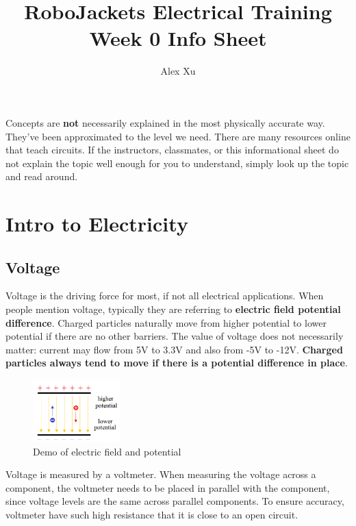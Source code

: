 \documentclass{article}
\title{RoboJackets Electrical Training Week 0 Info Sheet}
\author{Alex Xu}
\begin{document}
\maketitle{}
\setcounter{tocdepth}{2}
\tableofcontents
\vspace{120pt}
\large{Concepts are \textbf{not} necessarily explained in the most physically accurate way. They've been approximated to the level we need. There are many resources online that teach circuits. If the instructors, classmates, or this informational sheet do not explain the topic well enough for you to understand, simply look up the topic and read around.}

\pagebreak

\section{Intro to Electricity}
\subsection{Voltage}

Voltage is the driving force for most, if not all electrical applications. When people mention voltage, typically they are referring to \textbf{electric field potential difference}. Charged particles naturally move from higher potential to lower potential if there are no other barriers. The value of voltage does not necessarily matter: current may flow from 5V to 3.3V and also from -5V to -12V. \textbf{Charged particles always tend to move if there is a potential difference in place}.

\begin{figure}[!h]
	\center
	\includegraphics[width=0.3\textwidth, keepaspectratio]{efield}
	\caption{Demo of electric field and potential}
	\label{fig:efield}
\end{figure}

Voltage is measured by a voltmeter. When measuring the voltage across a component, the voltmeter needs to be placed in parallel with the component, since voltage levels are the same across parallel components. To ensure accuracy, voltmeter have such high resistance that it is close to an open circuit. 
\end{document}
